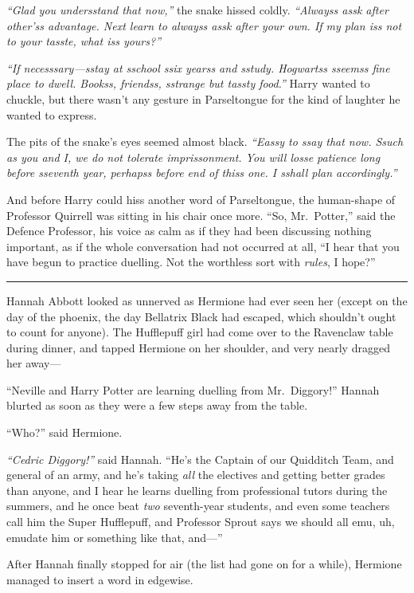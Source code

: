 \emph{``Glad you undersstand that now,''} the snake hissed coldly.
\emph{``Alwayss assk after other'ss advantage. Next learn to alwayss
assk after your own. If my plan iss not to your tasste, what iss
yours?''}

\emph{``If necesssary---sstay at sschool ssix yearss and sstudy.
Hogwartss sseemss fine place to dwell. Bookss, friendss, sstrange but
tassty food.''} Harry wanted to chuckle, but there wasn't any gesture in
Parseltongue for the kind of laughter he wanted to express.

The pits of the snake's eyes seemed almost black. \emph{``Eassy to ssay
that now. Ssuch as you and I, we do not tolerate imprissonment. You will
losse patience long before sseventh year, perhapss before end of thiss
one. I sshall plan accordingly.''}

And before Harry could hiss another word of Parseltongue, the
human-shape of Professor Quirrell was sitting in his chair once more.
``So, Mr.~Potter,'' said the Defence Professor, his voice as calm as if
they had been discussing nothing important, as if the whole conversation
had not occurred at all, ``I hear that you have begun to practice
duelling. Not the worthless sort with \emph{rules}, I hope?''

\begin{center}\rule{3in}{0.4pt}\end{center}

Hannah Abbott looked as unnerved as Hermione had ever seen her (except
on the day of the phoenix, the day Bellatrix Black had escaped, which
shouldn't ought to count for anyone). The Hufflepuff girl had come over
to the Ravenclaw table during dinner, and tapped Hermione on her
shoulder, and very nearly dragged her away---

``Neville and Harry Potter are learning duelling from Mr.~Diggory!''
Hannah blurted as soon as they were a few steps away from the table.

``Who?'' said Hermione.

\emph{``Cedric Diggory!''} said Hannah. ``He's the Captain of our
Quidditch Team, and general of an army, and he's taking \emph{all} the
electives and getting better grades than anyone, and I hear he learns
duelling from professional tutors during the summers, and he once beat
\emph{two} seventh-year students, and even some teachers call him the
Super Hufflepuff, and Professor Sprout says we should all emu, uh,
emudate him or something like that, and---''

After Hannah finally stopped for air (the list had gone on for a while),
Hermione managed to insert a word in edgewise.


